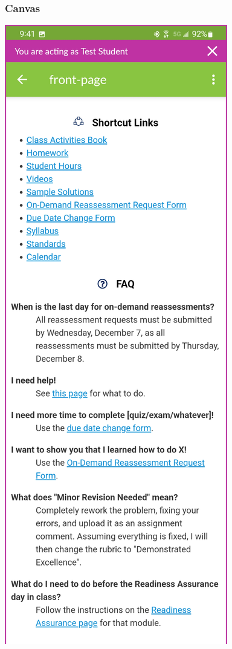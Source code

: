 \documentclass[aspectratio=1610]{beamer}
\begin{document}
\begin{frame}\frametitle{Canvas}
\begin{center}
\includegraphics[height=0.9\textheight]{canvas_more.jpg}
\end{center}
\end{frame}
\end{document}
